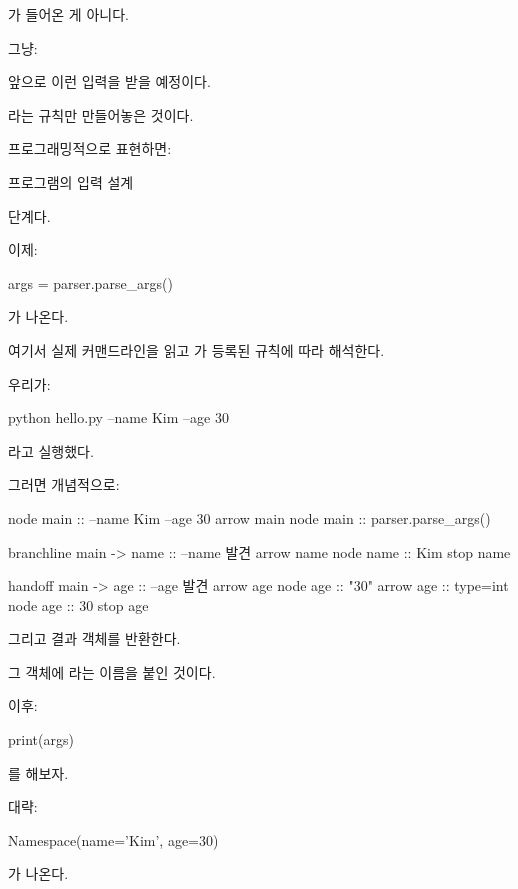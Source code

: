 가 들어온 게 아니다.

그냥:

\begin{dhksmry}[centered]
앞으로 이런 입력을 받을 예정이다.
\end{dhksmry}

라는 규칙만 만들어놓은 것이다.

프로그래밍적으로 표현하면:

\begin{dhksmry}[centered]
프로그램의 입력 설계
\end{dhksmry}

단계다.

이제:

\begin{dhkcode}
args = parser.parse_args()
\end{dhkcode}

가 나온다.

여기서 실제 커맨드라인을 읽고 가 등록된 규칙에 따라 해석한다.

우리가:

\begin{dhkzsh}
python hello.py --name Kim --age 30
\end{dhkzsh}

라고 실행했다.

그러면 개념적으로:

\begin{dhkbranch}[in=8]
node main :: --name Kim --age 30
arrow main
node main :: parser.parse_args()

branchline main -> name :: --name 발견
arrow name
node name :: Kim
stop name

handoff main -> age :: --age 발견
arrow age
node age :: "30"
arrow age :: type=int
node age :: 30
stop age
\end{dhkbranch}

그리고 결과 객체를 반환한다.

그 객체에 라는 이름을 붙인 것이다.

이후:

\begin{dhkcode}
print(args)
\end{dhkcode}

를 해보자.

대략:

\begin{dhkzsh}
Namespace(name='Kim', age=30)
\end{dhkzsh}

가 나온다.

